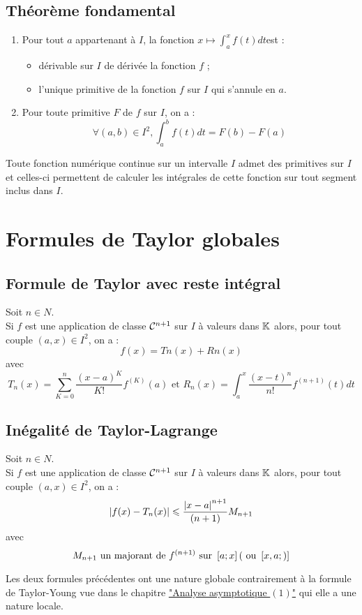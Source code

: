 \subsection{Théorème fondamental}
\begin{theo}
    \begin{enumerate}
        \item Pour tout \(a\) appartenant à \(I\), la fonction \(x \mapsto \int^x_a f (t) dt \)est :
        \begin{itemize}
            \item dérivable sur \(I\) de dérivée la fonction \(f\) ;
            \item l’unique primitive de la fonction \(f\) sur \(I\) qui s’annule en \(a\).
        \end{itemize}
        \item Pour toute primitive \(F\) de \(f\) sur \(I\), on a :
        \[\forall (a, b) \in  I^2,\int^b_a f (t) dt = F (b) -  F (a)\]
    \end{enumerate}
\end{theo}
\begin{defprop}
    Toute fonction numérique continue sur un intervalle \(I\) admet des primitives sur \(I\) et celles-ci permettent de calculer les intégrales de cette fonction sur tout segment inclus dans \(I\).
\end{defprop}
\section{Formules de Taylor globales}
\subsection{Formule de Taylor avec reste intégral}
\begin{defprop}
    Soit \(n \in  N\). \\
    Si \(f\) est une application de classe \(\cal{C}^{n+1}\) sur \(I\) à valeurs dans \(\K\) alors, pour tout couple \((a, x) \in  I^2\), on a :
    \[f (x) = Tn(x) + Rn(x)\]
    avec
    \[ T_n(x) = \sum^n_{K=0}\frac{(x -  a)^K}{K!} f^{(K)}(a) \text{ et } R_n(x) =\int^x_a \frac{(x -  t)^n}{n!} f^{(n+1)}(t) dt\]
\end{defprop}
\subsection{Inégalité de Taylor-Lagrange}
\begin{defprop}
    Soit \(n \in  N\).\\
    Si \(f\) est une application de classe \(\cal{C}^{n+1}\) sur \(I\) à valeurs dans \(\K\) alors, pour tout couple \((a, x) \in  I^2\), on a :
    \[\abs{f (x) -  T_n(x)} \leq \frac{\abs{x -  a}^{n+1}}{(n + 1)}M_{n+1}\]
    avec
    \[M_{n+1} \text{ un majorant de }f^{(n+1)} \text{ sur } \intervii{a}{x} (\text{ ou } \intervii{x, a})\]
\end{defprop}
\begin{defprop}[Remarque]
Les deux formules précédentes ont une nature globale contrairement à la formule de Taylor-Young vue dans le chapitre \hyperref[chap:analyse-asymptotique1]{"Analyse asymptotique \((1)\)"} qui elle a une nature locale.
\end{defprop}